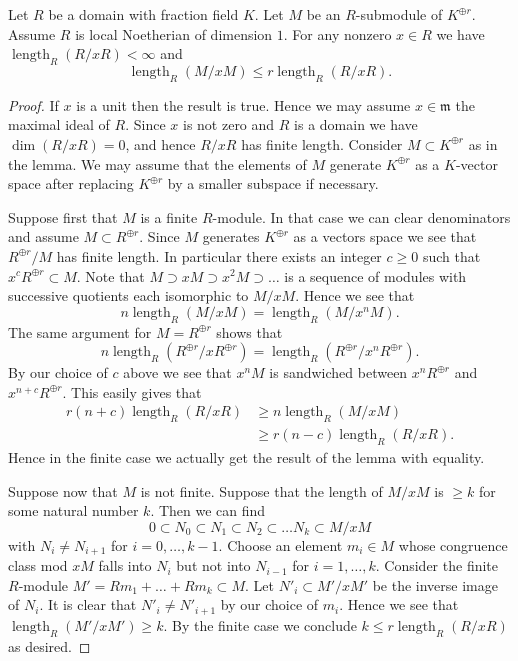 \begin{lemma}[10.119.9]
Let $R$ be a domain with fraction field $K$. Let $M$ be an $R$-submodule of $K^{\oplus r}$. Assume $R$ is local Noetherian of dimension $1$. For any nonzero $x\in R$ we have $\operatorname{length}_R(R/xR)<\infty$ and
\[\operatorname{length}_R(M/xM)\leq r\operatorname{length}_R(R/xR).\]
\end{lemma}
\begin{proof}
If $x$ is a unit then the result is true. Hence we may assume $x\in\mathfrak m$ the maximal ideal of $R$. Since $x$ is not zero and $R$ is a domain we have $\dim(R/xR)=0$, and hence $R/xR$ has finite length. Consider $M\subset K^{\oplus r}$ as in the lemma. We may assume that the elements of $M$ generate $K^{\oplus r}$ as a $K$-vector space after replacing $K^{\oplus r}$ by a smaller subspace if necessary.

Suppose first that $M$ is a finite $R$-module. In that case we can clear denominators and assume $M\subset R^{\oplus r}$. Since $M$ generates $K^{\oplus r}$ as a vectors space we see that $R^{\oplus r}/M$ has finite length. In particular there exists an integer $c\geq0$ such that $x^cR^{\oplus r}\subset M$. Note that $M\supset xM\supset x^2M\supset\ldots$ is a sequence of modules with successive quotients each isomorphic to $M/xM$. Hence we see that
\[n\operatorname{length}_R(M/xM)=\operatorname{length}_R(M/x^nM).\]
The same argument for $M=R^{\oplus r}$ shows that
\[n\operatorname{length}_R(R^{\oplus r}/xR^{\oplus r})=\operatorname{length}_R(R^{\oplus r}/x^nR^{\oplus r}).\]
By our choice of $c$ above we see that $x^nM$ is sandwiched between $x^nR^{\oplus r}$ and $x^{n+c}R^{\oplus r}$. This easily gives that
\[\begin{split}
r(n+c)\operatorname{length}_R(R/xR)&\geq n\operatorname{length}_R(M/xM)\\
&\geq r(n-c)\operatorname{length}_R(R/xR).
\end{split}\]
Hence in the finite case we actually get the result of the lemma with equality.

Suppose now that $M$ is not finite. Suppose that the length of $M/xM$ is $\geq k$ for some natural number $k$. Then we can find
\[0\subset N_0\subset N_1\subset N_2\subset\ldots N_k\subset M/xM\]
with $N_i\ne N_{i+1}$ for $i=0,\ldots,k-1$. Choose an element $m_i\in M$ whose congruence class mod $xM$ falls into $N_i$ but not into $N_{i-1}$ for $i=1,\ldots,k$. Consider the finite $R$-module $M'=Rm_1+\ldots+Rm_k\subset M$. Let $N'_i\subset M'/xM'$ be the inverse image of $N_i$. It is clear that $N'_i\ne N'_{i+1}$ by our choice of $m_i$. Hence we see that $\operatorname{length}_R(M'/xM')\geq k$. By the finite case we conclude $k\leq r\operatorname{length}_R(R/xR)$ as desired.
\end{proof}

